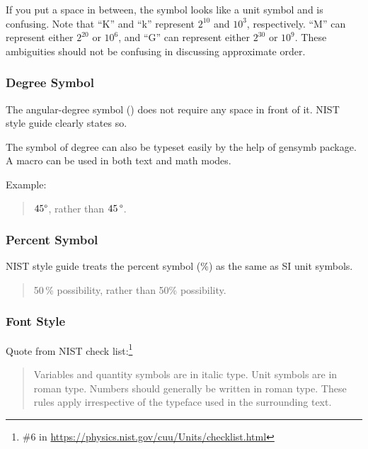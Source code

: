 If you put a space in between, the symbol looks like a unit symbol and
is confusing.
Note that ``K'' and ``k'' represent $2^{10}$ and $10^3$, respectively.
``M'' can represent either $2^{20}$ or $10^6$, and ``G'' can represent
either $2^{30}$ or $10^9$.
These ambiguities should not be confusing in discussing approximate order.

\subsubsection{Degree Symbol}
\label{sec:app:styleguide:Degree Symbol}

The angular-degree symbol (\degree) does not require any space in front
of it.
NIST style guide clearly states so.

The symbol of degree can also be typeset easily by the help of gensymb
package.
A macro \qco{\\degree} can be used in both text and math modes.

Example:

\begin{quote}
  $45\degree$, rather than $45\,\degree$.
\end{quote}

\subsubsection{Percent Symbol}
\label{sec:app:styleguide:Percent Symbol}

NIST style guide treats the percent symbol (\%) as the same as SI unit
symbols.

\begin{quote}
  50\,\% possibility, rather than 50\% possibility.
\end{quote}

\subsubsection{Font Style}
\label{sec:app:styleguide:Font Style}

Quote from NIST check list:\footnote{
  \#6 in \url{https://physics.nist.gov/cuu/Units/checklist.html}
}

\begin{quote}
  Variables and quantity symbols are in italic type.
  Unit symbols are in roman type.
  Numbers should generally be written in roman type.
  These rules apply irrespective of the typeface used in the surrounding
  text.
\end{quote}


